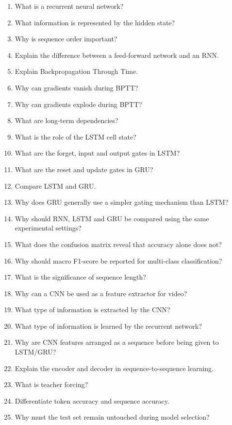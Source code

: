 \documentclass[10pt]{article}
\begin{document}
\begin{enumerate}
\item What is a recurrent neural network?
\item What information is represented by the hidden state?
\item Why is sequence order important?
\item Explain the difference between a feed-forward network and an RNN.
\item Explain Backpropagation Through Time.
\item Why can gradients vanish during BPTT?
\item Why can gradients explode during BPTT?
\item What are long-term dependencies?
\item What is the role of the LSTM cell state?
\item What are the forget, input and output gates in LSTM?
\item What are the reset and update gates in GRU?
\item Compare LSTM and GRU.
\item Why does GRU generally use a simpler gating mechanism than LSTM?
\item Why should RNN, LSTM and GRU be compared using the same experimental settings?
\item What does the confusion matrix reveal that accuracy alone does not?
\item Why should macro F1-score be reported for multi-class classification?
\item What is the significance of sequence length?
\item Why can a CNN be used as a feature extractor for video?
\item What type of information is extracted by the CNN?
\item What type of information is learned by the recurrent network?
\item Why are CNN features arranged as a sequence before being given to LSTM/GRU?
\item Explain the encoder and decoder in sequence-to-sequence learning.
\item What is teacher forcing?
\item Differentiate token accuracy and sequence accuracy.
\item Why must the test set remain untouched during model selection?
\end{enumerate}

\end{document}
